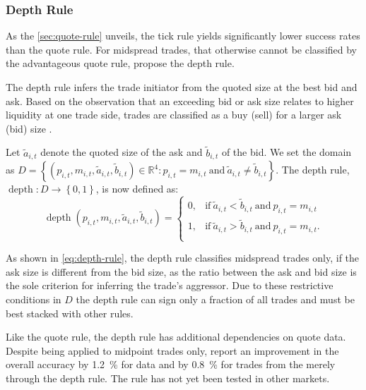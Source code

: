 \subsubsection{Depth Rule}\label{sec:depth-rule}

As the \cref{sec:quote-rule} unveils, the tick rule yields significantly lower success rates than the quote rule. For midspread trades, that otherwise cannot be classified by the advantageous quote rule, \textcite[][14]{grauerOptionTradeClassification2022} propose the depth rule.

The depth rule infers the trade initiator from the quoted size at the best bid and ask. Based on the observation that an exceeding bid or ask size relates to higher liquidity at one trade side, trades are classified as a buy (sell) for a larger ask (bid) size \autocite[][14]{grauerOptionTradeClassification2022}.

Let $\tilde{a}_{i,t}$ denote the quoted size of the ask and $\tilde{b}_{i,t}$ of the bid. We set the domain as $D = \left\{(p_{i,t}, m_{i,t}, \tilde{a}_{i,t}, \tilde{b}_{i,t}) \in \mathbb{R}^4: p_{i,t} = m_{i,t} \ \text{and} \ \tilde{a}_{i,t} \neq \tilde{b}_{i,t} \right\}$. The depth rule, $\operatorname{depth} \colon D \to \left\{0,1\right\}$, is now defined as:
\begin{equation}
  \operatorname{depth}(p_{i,t}, m_{i,t}, \tilde{a}_{i,t}, \tilde{b}_{i,t})=
  \begin{cases}
    0, & \text{if}\ \tilde{a}_{i,t} < \tilde{b}_{i,t} \ \text{and}\ p_{i, t} = m_{i, t}  \\
    1, & \text{if}\ \tilde{a}_{i,t} > \tilde{b}_{i,t} \ \text{and}\ p_{i, t} = m_{i, t}. \\
  \end{cases}
  \label{eq:depth-rule}
\end{equation}

As shown in \cref{eq:depth-rule}, the depth rule classifies midspread trades only, if the ask size is different from the bid size, as the ratio between the ask and bid size is the sole criterion for inferring the trade's aggressor. Due to these restrictive conditions in $D$ the depth rule can sign only a fraction of all trades and must be best stacked with other rules.

Like the quote rule, the depth rule has additional dependencies on quote data. Despite being applied to midpoint trades only, \textcite[][4]{grauerOptionTradeClassification2022} report an improvement in the overall accuracy by \SI{1.2}{\percent} for  data and by \SI{0.8}{\percent} for trades from the  merely through the depth rule. The rule has not yet been tested in other markets.

